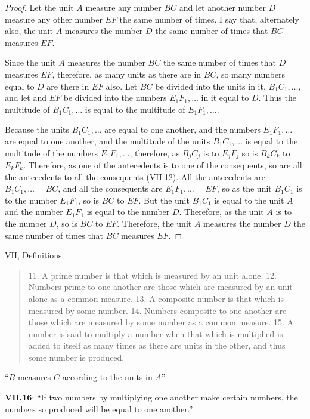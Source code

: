 \documentclass{article}
\begin{document}
\begin{proof}
Let the unit $A$ measure any number $BC$ and let
another number $D$ measure any other number $EF$ the same number of times.
I say that, alternately also, the unit $A$ measures the number $D$ the same number
of times that $BC$ measures $EF$. 

Since the unit $A$ measures the number $BC$ the same number of times that $D$ measures $EF$,
therefore, as many units as there are in $BC$, so many numbers equal to $D$ are there in $EF$ also.
Let $BC$ be divided into the units in it,
$B_1C_1,\ldots$, and let 
and $EF$ be divided into the numbers $E_1F_1,\ldots$ in it equal to $D$.
Thus the multitude of $B_1C_1,\ldots$ is equal to the multitude of $E_1F_1,\ldots$.

Because the units $B_1C_1,\ldots$ are equal to one another,
and the numbers $E_1F_1,\ldots$ are equal to one another,
and the multitude of the units $B_1C_1,\ldots$ is equal to the multitude of the numbers
$E_1F_1,\ldots$, therefore,
as $B_jC_j$ is to $E_jF_j$ so is $B_kC_k$ to $E_kF_k$.
Therefore, 
as one of the antecedents is to one of the consequents, so are all the antecedents to all the consequents (VII.12).
All the antecedents are $B_1C_1,\ldots=BC$, and all the consequents are $E_1F_1,\ldots=EF$,  
so as the unit $B_1C_1$ is to the number $E_1F_1$, so is $BC$ to $EF$.
But the unit $B_1C_1$ is equal to the unit $A$ and the number $E_1F_1$ is equal to the number $D$.
Therefore, as the unit $A$ is to the number $D$, so is $BC$ to $EF$.
Therefore, the unit $A$ measures the number $D$ the same number of times that $BC$ measures $EF$.
\end{proof}

VII, Definitions:

\begin{quote}
11. A prime number is that which is measured by an unit alone.
12. Numbers prime to one another are those which are measured by an unit alone as a common measure.
13. A composite number is that which is measured by some number.
14. Numbers composite to one another are those which are measured by some number as a common measure.
15. A number is said to multiply a number when that which is multiplied is added to itself as many times as there are units in the other, and thus some number is produced.
\end{quote}

``$B$ measures $C$ according to the units in $A$''

\textbf{VII.16}: ``If two numbers by multiplying one another make certain numbers, the numbers so produced will be equal to one another.''
\end{document}
